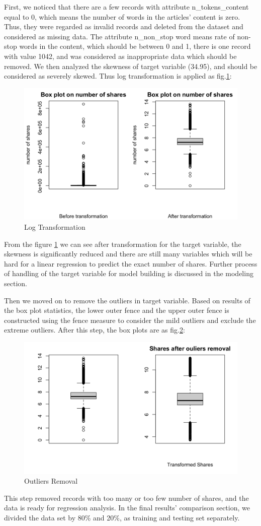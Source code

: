 \documentclass[letterpaper,12pt]{article}
\begin{document}
First, we noticed that there are a few records with attribute n\_tokens\_content equal to 0, which means the number of words in the articles' content is zero. Thus, they were regarded as invalid records and deleted from the dataset and considered as missing data. The attribute n\_non\_stop word means rate of non-stop words in the content, which should be between 0 and 1, there is one record with value 1042, and was considered as inappropriate data which should be removed. We then analyzed the skewness of target variable (34.95), and should be considered as severely skewed. Thus log transformation is applied as fig.\ref{fig1}:
\begin{figure}
\centering
    \includegraphics[width=0.7\linewidth]{1.png}
    \caption{Log Transformation}
    \label{fig1}
\end{figure}

From the figure \ref{fig1} we can see after transformation for the target variable, the skewness is significantly reduced and there are still many variables which will be hard for a linear regression to predict the exact number of shares. Further process of handling of the target variable for model building is discussed in the modeling section. 

Then we moved on to remove the outliers in target variable. Based on results of the box plot statistics, the lower outer fence and the upper outer fence is constructed using the fence measure to consider the mild outliers and exclude the extreme outliers. After this step, the box plots are as fig.\ref{fig2}:
\begin{figure}
\centering
    \includegraphics[width=0.7\linewidth]{2.png}
    \caption{Outliers Removal}
    \label{fig2}
\end{figure}
This step removed records with too many or too few number of shares, and the data is ready for regression analysis. In the final results' comparison section, we divided the data set by 80\% and 20\%, as training and testing set separately.
\end{document}

